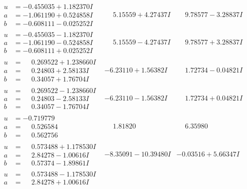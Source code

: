 \documentclass[1p]{elsarticle_modified}
\theoremstyle{definition}
\begin{document}
$$\begin{array}{c|c|c}
\begin{aligned}
u &= -0.455035 + 1.182370 I \\
a &= -1.061190 + 0.524858 I \\
b &= -0.608111 - 0.025252 I\end{aligned}
 & \phantom{-}5.15559 + 4.27437 I & \phantom{-}9.78577 - 3.28837 I \\ \hline\begin{aligned}
u &= -0.455035 - 1.182370 I \\
a &= -1.061190 - 0.524858 I \\
b &= -0.608111 + 0.025252 I\end{aligned}
 & \phantom{-}5.15559 - 4.27437 I & \phantom{-}9.78577 + 3.28837 I \\ \hline\begin{aligned}
u &= \phantom{-}0.269522 + 1.238660 I \\
a &= \phantom{-}0.24803 + 2.58133 I \\
b &= \phantom{-}0.34057 + 1.76704 I\end{aligned}
 & -6.23110 + 1.56382 I & \phantom{-}1.72734 - 0.04821 I \\ \hline\begin{aligned}
u &= \phantom{-}0.269522 - 1.238660 I \\
a &= \phantom{-}0.24803 - 2.58133 I \\
b &= \phantom{-}0.34057 - 1.76704 I\end{aligned}
 & -6.23110 - 1.56382 I & \phantom{-}1.72734 + 0.04821 I \\ \hline\begin{aligned}
u &= -0.719779\phantom{ +0.000000I} \\
a &= \phantom{-}0.526584\phantom{ +0.000000I} \\
b &= \phantom{-}0.562756\phantom{ +0.000000I}\end{aligned}
 & \phantom{-}1.81820\phantom{ +0.000000I} & \phantom{-}6.35980\phantom{ +0.000000I} \\ \hline\begin{aligned}
u &= \phantom{-}0.573488 + 1.178530 I \\
a &= \phantom{-}2.84278 - 1.00616 I \\
b &= \phantom{-}0.57374 - 1.89861 I\end{aligned}
 & -8.35091 - 10.39480 I & -0.03516 + 5.66347 I \\ \hline\begin{aligned}
u &= \phantom{-}0.573488 - 1.178530 I \\
a &= \phantom{-}2.84278 + 1.00616 I \\

\end{aligned}
\end{array}$$
\end{document}
